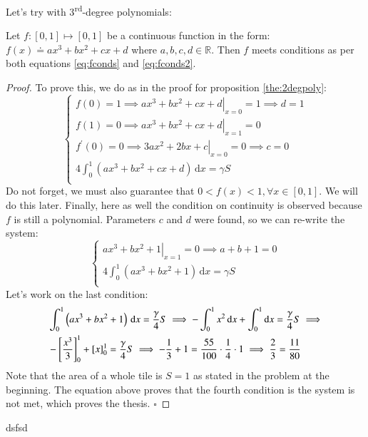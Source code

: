 Let's try with 3\textsuperscript{rd}-degree polynomials:
\begin{proposition}
\label{the:3degpoly}
Let $f:[0,1] \mapsto [0,1]$ be a continuous function in the form: 
$f(x) \doteq ax^3+bx^2+cx+d$ where $a,b,c,d \in \mathbb{R}$. 
Then $f$ meets conditions as per both
equations \ref{eq:fconds} and \ref{eq:fconds2}.
\begin{proof}
To prove this, we do as in the proof for proposition \ref{the:2degpoly}:
\begin{equation*}
\begin{cases}
f(0)=1 \implies \left. ax^3+bx^2+cx+d \right|_{x=0} = 1 \implies d = 1 \\
f(1)=0 \implies \left. ax^3+bx^2+cx+d \right|_{x=1} = 0\\
f^\prime(0) = 0 \implies \left. 3ax^2 + 2bx + c \right|_{x=0} = 0 \implies c = 0 \\
4 \int^{1}_{0} \left( ax^3+bx^2+cx+d \right) \, \mathrm{d} x = \gamma S \\
\end{cases}
\end{equation*}
Do not forget, we must also 
guarantee that $0 < f(x) < 1, \forall x \in [0,1]$. We will do this later. 
Finally, here as well the condition on continuity is observed because $f$ is 
still a polynomial.
Parameters $c$ and $d$ were found, so we can re-write the system:
\begin{equation*}
\begin{cases}
\left. ax^3+bx^2+1 \right|_{x=1} = 0 \implies a+b+1=0\\
4 \int^{1}_{0} \left( ax^3+bx^2+1 \right) \, \mathrm{d} x = \gamma S \\
\end{cases}
\end{equation*}
Let's work on the last condition:
\begin{align*}
&\int^{1}_{0} \left( ax^3+bx^2+1 \right) \, \mathrm{d} x = \frac{\gamma}{4} S
\implies
-\int^{1}_{0} x^2 \, \mathrm{d} x + \int^{1}_{0} \mathrm{d} x = 
        \frac{\gamma}{4} S \implies \notag\\
&- \left[\frac{x^3}{3}\right]_0^1 + \left[x\right]_0^1 = \frac{\gamma}{4} S
\implies -\frac{1}{3} + 1 = \frac{55}{100} \cdot \frac{1}{4} \cdot 1
\implies \frac{2}{3} = \frac{11}{80}
\end{align*}
Note that the area of a whole tile is $S=1$ as stated in the problem at the beginning.
The equation above proves that the fourth condition is the system is not met, which
proves the thesis.
$\square$
\end{proof}
\end{proposition}
dsfsd